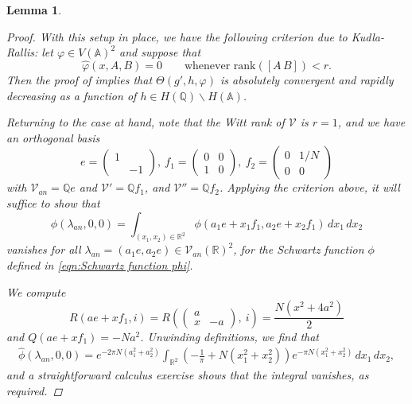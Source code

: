 \documentclass[reqno,oneside]{amsart}
\theoremstyle{plain}
\newtheorem{lemma}[theorem]{Lemma}
\theoremstyle{remark}
\numberwithin{theorem}{section}
\newcommand{\bbA}{\mathbb A}
\newcommand{\bbQ}{\mathbb Q}
\newcommand{\bbR}{\mathbb R}
\newcommand{\calV}{\mathcal V}
\newcommand{\psm}[1]{\left( \begin{smallmatrix}#1 \end{smallmatrix} \right)}
\begin{document}
\begin{lemma}
\begin{proof}
			With this setup in place, we have the following criterion due to Kudla-Rallis:  let $\varphi \in V(\bbA)^2$ and suppose that
			\begin{equation}  \label{eqn:theta convergence criterion}
			\widehat \varphi( x, A, B) = 0 \qquad \text{whenever } \mathrm{rank}([A \, B]) < r.
			\end{equation}
			Then the proof of \cite[Proposition 5.3.1]{KudlaRallisRegSW} implies that $\Theta(g',h, \varphi)$ is absolutely convergent and rapidly decreasing as a function of $h \in H(\bbQ) \backslash H(\bbA)$.
			
			
			Returning to the case at hand, note that the Witt rank of $\calV$ is $r=1$, and we have an orthogonal basis
			\begin{equation}
			e =   \psm{1 & \\ & -1}, \  f_1 = \psm{0 &  0 \\ 1 & 0}, \ f_2 = \psm{ 0 & 1/N \\ 0 & 0 }
			\end{equation}
			with $\calV_{an} = \bbQ e$ and $\calV' = \bbQ f_1$, and $\calV'' = \bbQ f_2$. Applying the criterion above, it will suffice to show that
			\begin{equation}
			\widehat \phi( \lambda_{an}, 0, 0)  = \int_{(x_1, x_2) \in \bbR^2}  \phi(   a_1e + x_1 f_1, a_2 e + x_2 f_1)  \, dx_1 \, dx_2
			\end{equation}
			vanishes for all $\lambda_{an} = (a_1 e, a_2e) \in \calV_{an}(\bbR)^2$, for the Schwartz function $\phi$ defined in \eqref{eqn:Schwartz function phi}.
			
			We compute
			\begin{equation}
			R \left( a e + x f_1 , i \right) = R \left( \begin{pmatrix} a & \\ x & -a \end{pmatrix}, \ i \right)  = \frac{N(x^2 + 4 a^2)}{2}
			\end{equation}
			and $Q(a e + x f_1) = -N a^2$. Unwinding definitions, we find that
			\begin{align}
			\widehat \phi( \lambda_{an}, 0, 0) =  e^{ - 2 \pi N (a_1^2 + a_2^2)}  \int_{\bbR^2}  \left( - \frac{1}{\pi} + N( x_1^2 + x_2^2) \right) e^{- \pi N (x_1^2 + x_2^2) }\, dx_1 \, dx_2,
			\end{align}
			and a straightforward calculus exercise shows that the integral vanishes, as required.
		\end{proof}
	\end{lemma}
	
\end{document}
